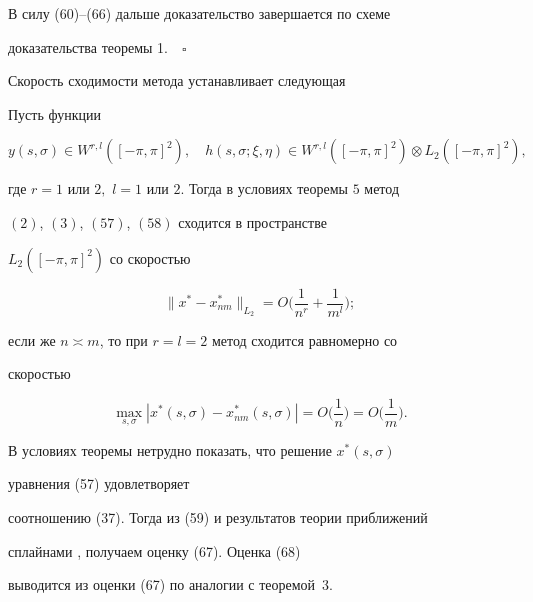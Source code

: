  


В силу (60)--(66) дальше доказательство завершается по схеме 


доказательства теоремы 1.$\quad\square$ 


\medskip 


 


Скорость сходимости метода устанавливает следующая 


 


\begin{thm} 


Пусть функции 


$$ 


y(s,\sigma)\in W^{r,l}([-\pi,\pi]^2),\quad 


h(s,\sigma;\xi,\eta)\in W^{r,l}([-\pi,\pi]^2)\otimes 


L_2([-\pi,\pi]^2), 


$$ 


где $r=1$ или $2,$ $l=1$ или $2$. Тогда в условиях теоремы $5$ метод 


$(2)$, $(3)$, $(57)$, $(58)$ сходится в пространстве 


$L_2([-\pi,\pi]^2)$ со скоростью 


\begin{equation} 


\|x^*-x^*_{nm}\|_{L_2}=O\bigg(\frac{1}{n^r}+\frac{1}{m^l} \bigg); 


\end{equation} 


если же $n\asymp m$, то при $r=l=2$ метод сходится равномерно со 


скоростью 


\begin{equation} 


\max_{s,\sigma}|x^*(s,\sigma)-x^*_{nm}(s,\sigma)|= 


O\bigg(\frac{1}{n} \bigg)=O\bigg(\frac{1}{m} \bigg). 


\end{equation} 


\end{thm} 


 


\begin{pf} 


В условиях теоремы нетрудно показать, что решение $x^*(s,\sigma)$ 


уравнения (57) удовлетворяет 


соотношению (37). Тогда из (59) и результатов теории приближений 


сплайнами \cite{11}, \cite{12} получаем оценку (67). Оценка (68) 


выводится из оценки (67) по аналогии с тео\-ре\-мой~3. 


\end{pf} 


